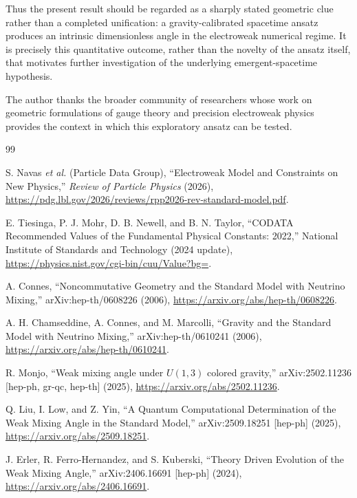 \documentclass[aps,prd,reprint,nofootinbib,floatfix]{revtex4-2}
\begin{document}
Thus the present result should be regarded as a sharply stated geometric clue rather than a completed unification: a gravity-calibrated spacetime ansatz produces an intrinsic dimensionless angle in the electroweak numerical regime.  It is precisely this quantitative outcome, rather than the novelty of the ansatz itself, that motivates further investigation of the underlying emergent-spacetime hypothesis.

\begin{acknowledgments}
The author thanks the broader community of researchers whose work on geometric formulations of gauge theory and precision electroweak physics provides the context in which this exploratory ansatz can be tested.
\end{acknowledgments}

\begin{thebibliography}{99}

S. Navas \textit{et al.} (Particle Data Group),
``Electroweak Model and Constraints on New Physics,''
\textit{Review of Particle Physics} (2026),
\url{https://pdg.lbl.gov/2026/reviews/rpp2026-rev-standard-model.pdf}.

E. Tiesinga, P. J. Mohr, D. B. Newell, and B. N. Taylor,
``CODATA Recommended Values of the Fundamental Physical Constants: 2022,''
National Institute of Standards and Technology (2024 update),
\url{https://physics.nist.gov/cgi-bin/cuu/Value?bg=}.

A. Connes,
``Noncommutative Geometry and the Standard Model with Neutrino Mixing,''
arXiv:hep-th/0608226 (2006),
\url{https://arxiv.org/abs/hep-th/0608226}.

A. H. Chamseddine, A. Connes, and M. Marcolli,
``Gravity and the Standard Model with Neutrino Mixing,''
arXiv:hep-th/0610241 (2006),
\url{https://arxiv.org/abs/hep-th/0610241}.

R. Monjo,
``Weak mixing angle under $U(1,3)$ colored gravity,''
arXiv:2502.11236 [hep-ph, gr-qc, hep-th] (2025),
\url{https://arxiv.org/abs/2502.11236}.

Q. Liu, I. Low, and Z. Yin,
``A Quantum Computational Determination of the Weak Mixing Angle in the Standard Model,''
arXiv:2509.18251 [hep-ph] (2025),
\url{https://arxiv.org/abs/2509.18251}.

J. Erler, R. Ferro-Hernandez, and S. Kuberski,
``Theory Driven Evolution of the Weak Mixing Angle,''
arXiv:2406.16691 [hep-ph] (2024),
\url{https://arxiv.org/abs/2406.16691}.


\end{thebibliography}
\end{document}
